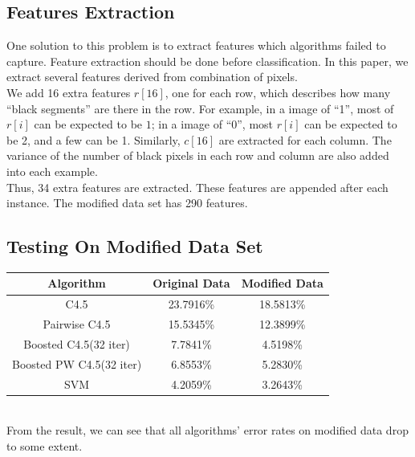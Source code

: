 \documentclass[a4paper,11pt]{article}
\begin{document}
\subsection{Features Extraction}
One solution to this problem is to extract features which algorithms failed to capture. Feature extraction should be done before classification. In this paper, we extract several features derived from combination of pixels.\\
We add 16 extra features $r[16]$, one for each row, which describes how many ``black segments'' are there in the row. For example, in a image of ``1'', most of $r[i]$ can be expected to be $1$; in a image of ``0'', most $r[i]$ can be expected to be 2, and a few can be 1. Similarly, $c[16]$ are extracted for each column. The variance of the number of black pixels in each row and column are also added into each example.\\
Thus, 34 extra features are extracted. These features are appended after each instance. The modified data set has 290 features.
\subsection{Testing On Modified Data Set}
\vspace{0.5cm}
\begin{tabular}{c c c}
Algorithm		&	Original Data	&Modified Data\\
\hline \hline
C4.5                            &23.7916\%		& 18.5813\%\\
Pairwise C4.5                   &15.5345\%      & 12.3899\%\\
Boosted C4.5(32 iter)	        &7.7841\%		& 4.5198\%\\
Boosted PW C4.5(32 iter)	    &6.8553\%       & 5.2830\%\\
SVM                         	&4.2059\%       & 3.2643\%\\
\end{tabular}
\vspace{0.5cm}\\
From the result, we can see that all algorithms' error rates on modified data drop to some extent.\\
\end{document}
